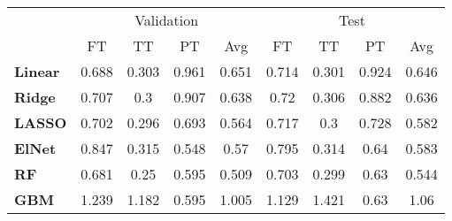 \begin{tabular}{lcccccccc}
\toprule
{} & \multicolumn{4}{c}{Validation} & \multicolumn{4}{c}{Test} \\
{} &         FT &     TT &     PT &    Avg &     FT &     TT &     PT &    Avg \\
\midrule
\textbf{Linear} &      0.688 &  0.303 &  0.961 &  0.651 &  0.714 &  0.301 &  0.924 &  0.646 \\
\textbf{Ridge } &      0.707 &    0.3 &  0.907 &  0.638 &   0.72 &  0.306 &  0.882 &  0.636 \\
\textbf{LASSO } &      0.702 &  0.296 &  0.693 &  0.564 &  0.717 &    0.3 &  0.728 &  0.582 \\
\textbf{ElNet } &      0.847 &  0.315 &  0.548 &   0.57 &  0.795 &  0.314 &   0.64 &  0.583 \\
\textbf{RF    } &      0.681 &   0.25 &  0.595 &  0.509 &  0.703 &  0.299 &   0.63 &  0.544 \\
\textbf{GBM   } &      1.239 &  1.182 &  0.595 &  1.005 &  1.129 &  1.421 &   0.63 &   1.06 \\
\bottomrule
\end{tabular}
